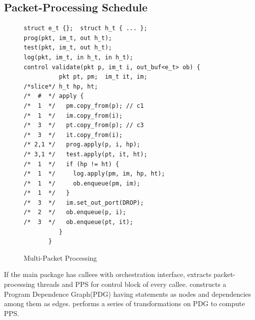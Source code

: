 \documentclass[letterpaper,twocolumn,10pt]{article}
\begin{document}
% 
% 





\subsection{Packet-Processing Schedule}
\label{subsubsection:packet-processing-schedule}


\begin{figure}[!h]
\begin{lstlisting}[frame=none]
struct e_t {};  struct h_t { ... };
prog(pkt, im_t, out h_t);
test(pkt, im_t, out h_t);
log(pkt, im_t, in h_t, in h_t);
control validate(pkt p, im_t i, out_buf<e_t> ob) {
          pkt pt, pm;  im_t it, im;  
/*slice*/ h_t hp, ht;
/*  #  */ apply {
/*  1  */   pm.copy_from(p); // c1
/*  1  */   im.copy_from(i);
/*  3  */   pt.copy_from(p); // c3 
/*  3  */   it.copy_from(i);
/* 2,1 */   prog.apply(p, i, hp); 
/* 3,1 */   test.apply(pt, it, ht); 
/*  1  */   if (hp != ht) {
/*  1  */     log.apply(pm, im, hp, ht);
/*  1  */     ob.enqueue(pm, im);
/*  1  */   }
/*  3  */   im.set_out_port(DROP);
/*  2  */   ob.enqueue(p, i);
/*  3  */   ob.enqueue(pt, it);
          }
       }
\end{lstlisting}
\caption{Multi-Packet Processing}
\label{fig:multi-packet-processing}
\end{figure}





If the main package has callees with orchestration interface, \ucomp 
extracts packet-processing threads and PPS for control block of every callee.
\ucomp constructs a Program Dependence Graph(PDG) 
\cite{Ferrante:1987:PDG:24039.24041} having statements as nodes and 
dependencies among them as edges. \ucomp  performs a series of transformations on PDG to compute PPS.
\end{document}
